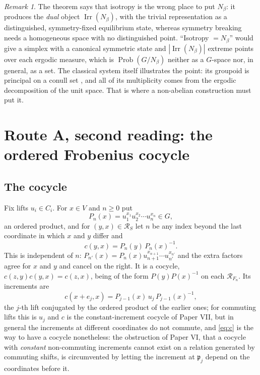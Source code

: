 \documentclass[11pt]{amsart}
\numberwithin{equation}{section}
\theoremstyle{definition}
\theoremstyle{remark}
\newtheorem{remark}[theorem]{Remark}
\newcommand{\cR}{\mathcal{R}}
\newcommand{\pp}{\mathfrak{p}}
\newcommand{\Irr}{\operatorname{Irr}}
\newcommand{\Prob}{\operatorname{Prob}}
\begin{document}
\begin{remark}
The theorem says that isotropy is the wrong place to put $N_\beta$: it produces the
\emph{dual} object $\Irr(N_\beta)$, with the trivial representation as a distinguished,
symmetry-fixed equilibrium state, whereas symmetry breaking needs a homogeneous space
with no distinguished point. ``Isotropy $=N_\beta$'' would give a simplex with a canonical
symmetric state and $|\Irr(N_\beta)|$ extreme points over each ergodic measure, which is
$\Prob(G/N_\beta)$ neither as a $G$-space nor, in general, as a set. The classical system
itself illustrates the point: its groupoid is principal on a conull set
\cite[Prop.~2.8]{Main}, and all of its multiplicity comes from the ergodic decomposition
of the unit space. That is where a non-abelian construction must put it.
\end{remark}

\section{Route A, second reading: the ordered Frobenius cocycle}\label{sec:ordered}

\subsection{The cocycle}

Fix lifts $u_i\in C_i$. For $x\in V$ and $n\ge0$ put
\begin{equation}\label{eq:Pn}
P_n(x)=u_1^{x_1}u_2^{x_2}\cdots u_n^{x_n}\in G,
\end{equation}
an ordered product, and for $(y,x)\in\cR_S$ let $n$ be any index beyond the last coordinate
in which $x$ and $y$ differ and
\begin{equation}\label{eq:c}
c(y,x)=P_n(y)\,P_n(x)^{-1}.
\end{equation}
This is independent of $n$: $P_{n'}(x)=P_n(x)u_{n+1}^{x_{n+1}}\cdots u_{n'}^{x_{n'}}$ and the
extra factors agree for $x$ and $y$ and cancel on the right. It is a cocycle,
$c(z,y)c(y,x)=c(z,x)$, being of the form $P(y)P(x)^{-1}$ on each $\cR_{F_n}$. Its
increments are
\begin{equation}\label{eq:incr}
c(x+e_j,x)=P_{j-1}(x)\,u_j\,P_{j-1}(x)^{-1},
\end{equation}
the $j$-th lift conjugated by the ordered product of the earlier ones; for commuting lifts
this is $u_j$ and $c$ is the constant-increment cocycle of Paper VII, but in general the
increments at different coordinates do not commute, and \eqref{eq:c} is the way to have a
cocycle nonetheless: the obstruction of Paper VI, that a cocycle with \emph{constant}
non-commuting increments cannot exist on a relation generated by commuting shifts, is
circumvented by letting the increment at $\pp_j$ depend on the coordinates before it.
\end{document}
